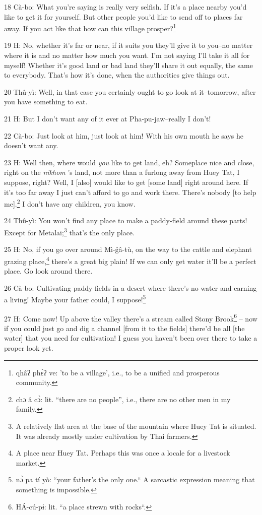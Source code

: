 18 Cà-bo: What you're saying is really very selfish. If it's a place nearby you'd
like to get it for yourself. But other people you'd like to send off to places
far away. If you act like that how can this village prosper?\footnote{qhâʔ phɛ̀ʔ ve: 'to be a village', i.e., to be a unified and prosperous community.}

19 H: No, whether it's far or near, if it suits you they'll give it to you--no
matter where it is and no matter how much you want. I'm not saying I'll take it
all for myself! Whether it's good land or bad land they'll share it out equally,
the same to everybody. That's how it's done, when the authorities give things out.

20 Thû-yì: Well, in that case you certainly ought to go look at it--tomorrow,
after you have something to eat.

21 H: But I don't want any of it ever at Pha-pu-jaw--really I don't!

22 Cà-bo: Just look at him, just look at him! With his own mouth he says he doesn't
want any.

23 H: Well then, where would  \textit{you } like to get land, eh? Someplace nice
and close, right on the  \textit{nikhom }'s land, not more than a furlong away
from Huey Tat, I suppose, right? Well, I [also] would like to get [some land] right
around here. If it's too far away I just can't afford to go and work there. There's
nobody [to help me].\footnote{chɔ â cɔ̀: lit. ``there are no people'', i.e., there are no other men in my family.} I don't have any children, you know.

24 Thû-yì: You won't find any place to make a paddy-field around these parts!
Except for Metalai;\footnote{A relatively flat area at the base of the mountain where Huey Tat is situated. It was already mostly under cultivation by Thai farmers.} that's the only place.

25 H: No, if you go over around Mì-g̈â-tù, on the way to the cattle and elephant
grazing place,\footnote{A place near Huey Tat. Perhaps this was once a locale for a livestock market.} there's a great big plain! If we can only get water it'll be
a perfect place. Go look around there.

26 Cà-bo: Cultivating paddy fields in a desert where there's no water and earning
a living! Maybe your father could, I suppose!\footnote{nɔ̀ pa tí yò: ``your father's the only one.`` A sarcastic expression meaning that something is impossible.}

27 H: Come now! Up above the valley there's a stream called Stony Brook\footnote{HÁ-cú-pɨ: lit. ``a place strewn with rocks``.} --
now if you could just go and dig a channel [from it to the fields] there'd be all
[the water] that you need for cultivation! I guess you haven't been over there
to take a proper look yet.

